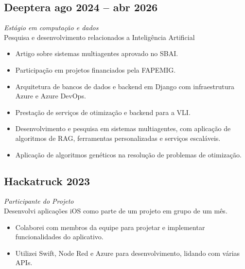 \documentclass[a4paper,10pt]{article}
\begin{document}
\subsection*{Deeptera \hfill ago 2024 -- abr 2026}
\textit{Estágio em computação e dados} \\
Pesquisa e desenvolvimento relacionados a Inteligência Artificial
\begin{itemize}
    \item Artigo sobre sistemas multiagentes aprovado no SBAI.
    \item Participação em projetos financiados pela FAPEMIG.
    \item Arquitetura de bancos de dados e backend em Django com infraestrutura Azure e Azure DevOps.
    \item Prestação de serviços de otimização e backend para a VLI.
    \item Desenvolvimento e pesquisa em sistemas multiagentes, com aplicação de algoritmos de RAG, ferramentas personalizadas e serviços escaláveis.
    \item Aplicação de algoritmos genéticos na resolução de problemas de otimização.
\end{itemize}

\subsection*{Hackatruck \hfill 2023}
\textit{Participante do Projeto} \\
Desenvolvi aplicações iOS como parte de um projeto em grupo de um mês.
\begin{itemize}
    \item Colaborei com membros da equipe para projetar e implementar funcionalidades do aplicativo.
    \item Utilizei Swift, Node Red e Azure para desenvolvimento, lidando com várias APIs.
\end{itemize}
\end{document}
